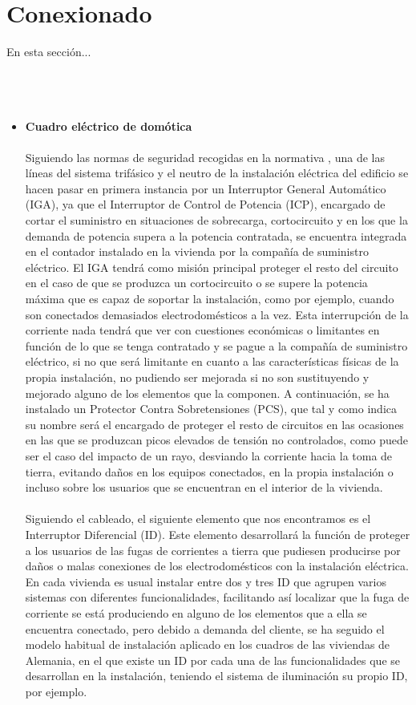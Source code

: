 \section{Conexionado}
En esta sección...\\\\\\\\
\begin{itemize}
\item \textbf{Cuadro eléctrico de domótica } \\ \\
Siguiendo las normas de seguridad recogidas en la normativa \cite{Reglamento:2021}, una de las líneas del sistema trifásico y el neutro de la instalación eléctrica del edificio se hacen pasar en primera instancia por un Interruptor General Automático (IGA), ya que el Interruptor de Control de Potencia (ICP), encargado de cortar el suministro en situaciones de sobrecarga, cortocircuito y en los que la demanda de potencia supera a la potencia contratada, se encuentra integrada en el contador instalado en la vivienda por la compañía de suministro eléctrico. El IGA tendrá como misión principal proteger el resto del circuito en el caso de que se produzca un cortocircuito o se supere la potencia máxima que es capaz de soportar la instalación, como por ejemplo, cuando son conectados demasiados electrodomésticos a la vez. Esta interrupción de la corriente nada tendrá que ver con cuestiones económicas o limitantes en función de lo que se tenga contratado y se pague a la compañía de suministro eléctrico, si no que será limitante en cuanto a las características físicas de la propia instalación, no pudiendo ser mejorada si no son sustituyendo y mejorado alguno de los elementos que la componen. A continuación, se ha instalado un Protector Contra Sobretensiones (PCS), que tal y como indica su nombre será el encargado de proteger el resto de circuitos en las ocasiones en las que se produzcan picos elevados de tensión no controlados, como puede ser el caso del impacto de un rayo, desviando la corriente hacia la toma de tierra, evitando daños en los equipos conectados, en la propia instalación o incluso sobre los usuarios que se encuentran en el interior de la vivienda.\\\\
Siguiendo el cableado, el siguiente elemento que nos encontramos es el Interruptor Diferencial (ID). Este elemento desarrollará la función de proteger a los usuarios de las fugas de corrientes a tierra que pudiesen producirse por daños o malas conexiones de los electrodomésticos con la instalación eléctrica. En cada vivienda es usual instalar entre dos y tres ID que agrupen varios sistemas con diferentes funcionalidades, facilitando así localizar que la fuga de corriente se está produciendo en alguno de los elementos que a ella se encuentra conectado, pero debido a demanda del cliente, se ha seguido el modelo habitual de instalación aplicado en los cuadros de las viviendas de Alemania, en el que existe un ID por cada una de las funcionalidades que se desarrollan en la instalación, teniendo el sistema de iluminación su propio ID, por ejemplo. \\\\

\end{itemize}
